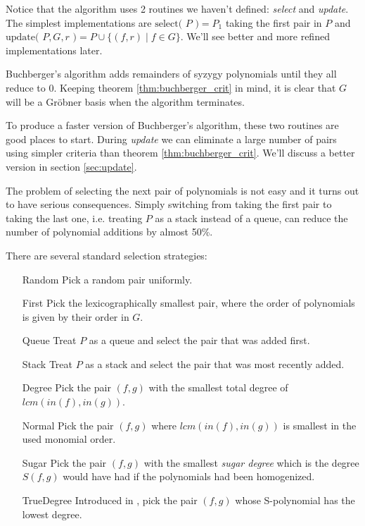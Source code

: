 \documentclass{article}
\theoremstyle{changedot}
\theoremstyle{changedotbreak}
\theoremstyle{nonumberplain}
\begin{document}
Notice that the algorithm uses 2 routines we haven't defined: \emph{select} and \emph{update}. The simplest implementations are $\text{select( $P$ )} = P_{1}$ taking the first pair in $P$ and $\text{update( $P, G, r$ )} = P \cup \{(f, r) \mid f \in G\}$. We'll see better and more refined implementations later.

Buchberger's algorithm adds remainders of syzygy polynomials until they all reduce to 0. Keeping theorem \ref{thm:buchberger_crit} in mind, it is clear that $G$ will be a Gröbner basis when the algorithm terminates.

To produce a faster version of Buchberger's algorithm, these two routines are good places to start. During \emph{update} we can eliminate a large number of pairs using simpler criteria than theorem \ref{thm:buchberger_crit}. We'll discuss a better version in section \ref{sec:update}.

The problem of selecting the next pair of polynomials is not easy and it turns out to have serious consequences. Simply switching from taking the first pair to taking the last one, i.e. treating $P$ as a stack instead of a queue, can reduce the number of polynomial additions by almost 50\%.

There are several standard selection strategies:

\begin{itemize}
  \item[Random] Pick a random pair uniformly.

  \item[First] Pick the lexicographically smallest pair, where the order of polynomials is given by their order in $G$.

  \item[Queue] Treat $P$ as a queue and select the pair that was added first.

  \item[Stack] Treat $P$ as a stack and select the pair that was most recently added.

  \item[Degree] Pick the pair $(f, g)$ with the smallest total degree of $lcm(in(f), in(g))$.

  \item[Normal] Pick the pair $(f, g)$ where $lcm(in(f), in(g))$ is smallest in the used monomial order.

  \item[Sugar] Pick the pair $(f, g)$ with the smallest \emph{sugar degree} which is the degree $S(f, g)$ would have had if the polynomials had been homogenized.

  \item[TrueDegree] Introduced in \cite{peifer}, pick the pair $(f, g)$ whose S-polynomial has the lowest degree.
\end{itemize}
\end{document}
